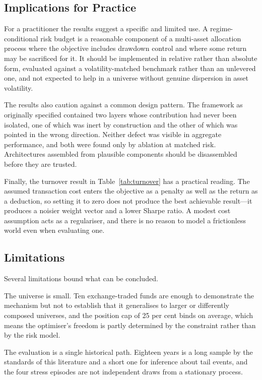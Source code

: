\documentclass{singlecol-new}
\theoremstyle{TH}{
\newtheorem{lemma}{Lemma}
\newtheorem{theorem}[lemma]{Theorem}
\newtheorem{corrolary}[lemma]{Corrolary}
\newtheorem{conjecture}[lemma]{Conjecture}
\newtheorem{proposition}[lemma]{Proposition}
\newtheorem{claim}[lemma]{Claim}
\newtheorem{stheorem}[lemma]{Wrong Theorem}
\newtheorem{algorithm}{Algorithm}
}
\theoremstyle{THrm}{
\newtheorem{definition}{Definition}[section]
\newtheorem{question}{Question}[section]
\newtheorem{remark}{Remark}
\newtheorem{scheme}{Scheme}
}
\theoremstyle{THhit}{
\newtheorem{case}{Case}[section]
}
\begin{document}
\subsection{Implications for Practice}

For a practitioner the results suggest a specific and limited use. A regime-conditional
risk budget is a reasonable component of a multi-asset allocation process where the
objective includes drawdown control and where some return may be sacrificed for it. It
should be implemented in relative rather than absolute form, evaluated against a
volatility-matched benchmark rather than an unlevered one, and not expected to help in
a universe without genuine dispersion in asset volatility.

The results also caution against a common design pattern. The framework as originally
specified contained two layers whose contribution had never been isolated, one of which
was inert by construction and the other of which was pointed in the wrong direction.
Neither defect was visible in aggregate performance, and both were found only by
ablation at matched risk. Architectures assembled from plausible components should be
disassembled before they are trusted.

Finally, the turnover result in Table~\ref{tab:turnover} has a practical reading. The assumed
transaction cost enters the objective as a penalty as well as the return as a
deduction, so setting it to zero does not produce the best achievable result---it
produces a noisier weight vector and a lower Sharpe ratio. A modest cost assumption acts
as a regulariser, and there is no reason to model a frictionless world even when
evaluating one.

\subsection{Limitations}

Several limitations bound what can be concluded.

The universe is small. Ten exchange-traded funds are enough to demonstrate the
mechanism but not to establish that it generalises to larger or differently composed
universes, and the position cap of 25 per cent binds on average, which means the
optimiser's freedom is partly determined by the constraint rather than by the risk
model.

The evaluation is a single historical path. Eighteen years is a long sample by the
standards of this literature and a short one for inference about tail events, and the
four stress episodes are not independent draws from a stationary process.
\end{document}
